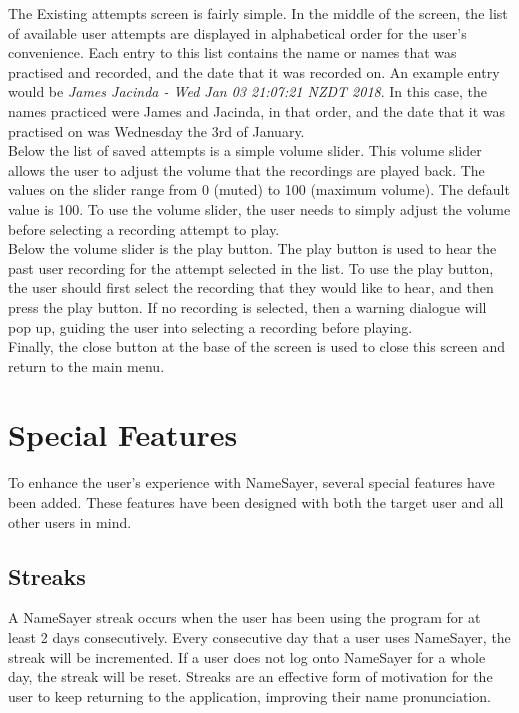 \documentclass{article}
\begin{document}
The Existing attempts screen is fairly simple. In the middle of the screen, the list of available user attempts are displayed in alphabetical order
for the user's convenience. Each entry to this list contains the name or names that was practised and recorded, and the date that it was
recorded on. An example entry would be {\em James Jacinda - Wed Jan 03 21:07:21 NZDT 2018}. In this case, the names practiced were
James and Jacinda, in that order, and the date that it was practised on was Wednesday the 3rd of January. \\

Below the list of saved attempts is a simple volume slider. This volume slider allows the user to adjust the volume that the 
recordings are played back. The values on the slider range from 0 (muted) to 100 (maximum volume). The default value is 100. To use the 
volume slider, the user needs to simply adjust the volume before selecting a recording attempt to play. \\

Below the volume slider is the play button. The play button is used to hear the past user recording for the attempt selected
in the list. To use the play button, the user should first select the recording that they would like to hear, and then press
the play button. If no recording is selected, then a warning dialogue will pop up, guiding the user into selecting a recording 
before playing. \\

Finally, the close button at the base of the screen is used to close this screen and return to the main menu.


\section{Special Features}
To enhance the user's experience with NameSayer, several special features have been added. These features have been designed
with both the target user and all other users in mind.

\subsection{Streaks}
A NameSayer streak occurs when the user has been using the program for at least 2 days consecutively. Every consecutive day 
that a user uses NameSayer, the streak will be incremented. If a user does not log onto NameSayer for a whole day, the 
streak will be reset. Streaks are an effective form of motivation for the user to keep returning to the application, 
improving their name pronunciation. \\
\end{document}
